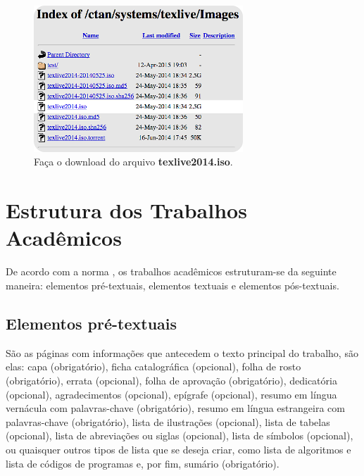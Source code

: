 \begin{figure}[!ht]
\centering
\caption{Faça o download do arquivo \textbf{texlive2014.iso}.}\label{texlive2014}
\includegraphics[width=0.7\textwidth]{./figuras/texlive2014.png}
\end{figure}

\section{Estrutura dos Trabalhos Acadêmicos}

De acordo com a norma , os trabalhos acadêmicos estruturam-se da seguinte maneira: elementos pré-textuais, elementos textuais e elementos pós-textuais.

\subsection{Elementos pré-textuais}

São as páginas com informações que antecedem o texto principal do trabalho, são elas: capa (obrigatório), ficha catalográfica (opcional), folha de rosto (obrigatório), errata (opcional), folha de aprovação (obrigatório), dedicatória (opcional), agradecimentos (opcional), epígrafe (opcional), resumo em língua vernácula com palavras-chave (obrigatório), resumo em língua estrangeira com palavras-chave (obrigatório), lista de ilustrações (opcional), lista de tabelas (opcional), lista de abreviações ou siglas (opcional), lista de símbolos (opcional), ou quaisquer outros tipos de lista que se deseja criar, como lista de algoritmos e lista de códigos de programas e, por fim, sumário (obrigatório).

